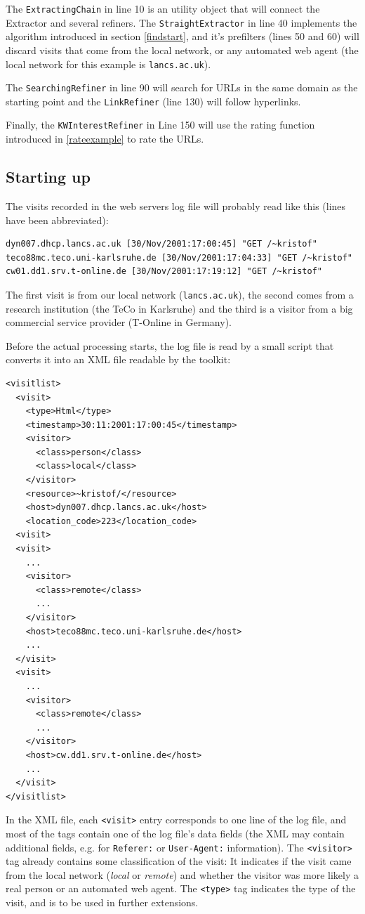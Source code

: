 \documentclass[a4paper]{danarticle}
\theoremstyle{remark}
\begin{document}
      The \verb$ExtractingChain$ in line 10 is an utility object that will 
      connect the Extractor and several refiners. The \verb$StraightExtractor$ 
      in line 40 implements the algorithm introduced in section
      \ref{findstart}, and 
      it's prefilters (lines 50 and 60) will discard visits that come from the 
      local network, or any automated web agent (the local network for this
      example is \verb$lancs.ac.uk$).
      
      The \verb$SearchingRefiner$ in line 90 will search for URLs in the same 
      domain as the starting point and the \verb$LinkRefiner$ (line 130) will 
      follow hyperlinks.
      
      Finally, the \verb$KWInterestRefiner$ in Line 150 will use the rating 
      function introduced in \ref{rateexample} to rate the URLs.
    \subsection*{Starting up}
      The visits recorded in the web servers log file will probably read
      like this (lines have been abbreviated):
      \begin{verbatim}
dyn007.dhcp.lancs.ac.uk [30/Nov/2001:17:00:45] "GET /~kristof"
teco88mc.teco.uni-karlsruhe.de [30/Nov/2001:17:04:33] "GET /~kristof"
cw01.dd1.srv.t-online.de [30/Nov/2001:17:19:12] "GET /~kristof"
      \end{verbatim}
      The first visit is from our local network (\verb$lancs.ac.uk$), the
      second comes from a research institution (the TeCo in Karlsruhe) and the
      third is a visitor from a big commercial service provider (T-Online in
      Germany).
      
      Before the actual processing starts, the log file is read by a small
      script that converts it into an XML file readable by the toolkit:
      \begin{verbatim}
<visitlist>
  <visit>
    <type>Html</type>
    <timestamp>30:11:2001:17:00:45</timestamp>
    <visitor>
      <class>person</class>
      <class>local</class>
    </visitor>
    <resource>~kristof/</resource>
    <host>dyn007.dhcp.lancs.ac.uk</host>
    <location_code>223</location_code>
  <visit>
  <visit>
    ...
    <visitor>
      <class>remote</class>
      ...
    </visitor>
    <host>teco88mc.teco.uni-karlsruhe.de</host>
    ...
  </visit>
  <visit>
    ...
    <visitor>
      <class>remote</class>
      ...
    </visitor>
    <host>cw.dd1.srv.t-online.de</host>
    ...
  </visit>
</visitlist>
      \end{verbatim}
      In the XML file, each \verb$<visit>$ entry corresponds to one line of the
      log file, and most of the tags contain one of the log file's data fields
      (the XML may contain additional fields, e.g. for \verb$Referer:$ or 
      \verb$User-Agent:$ information). The \verb$<visitor>$ tag already
      contains some classification of the visit: It indicates if the visit came
      from the local network (\textit{local} or \textit{remote}) and whether the
      visitor was more likely a real person or an automated web agent. The
      \verb$<type>$ tag indicates the type of the visit, and is to be used in
      further extensions.
\end{document}
